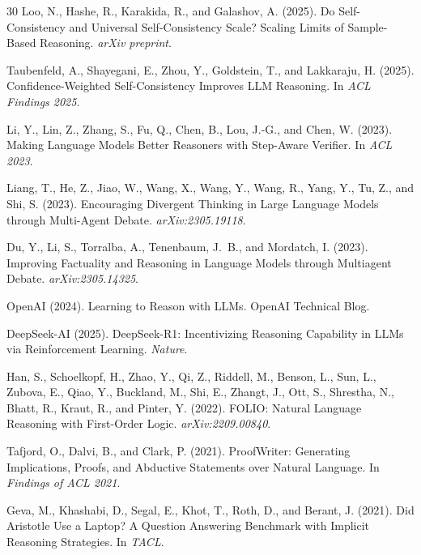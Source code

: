 \documentclass[11pt,a4paper]{article}
\begin{document}
\begin{thebibliography}{30}
Loo, N., Hashe, R., Karakida, R., and Galashov, A. (2025).
\newblock Do Self-Consistency and Universal Self-Consistency Scale? Scaling Limits of Sample-Based Reasoning.
\newblock \emph{arXiv preprint}.

Taubenfeld, A., Shayegani, E., Zhou, Y., Goldstein, T., and Lakkaraju, H. (2025).
\newblock Confidence-Weighted Self-Consistency Improves LLM Reasoning.
\newblock In \emph{ACL Findings 2025}.

Li, Y., Lin, Z., Zhang, S., Fu, Q., Chen, B., Lou, J.-G., and Chen, W. (2023).
\newblock Making Language Models Better Reasoners with Step-Aware Verifier.
\newblock In \emph{ACL 2023}.

Liang, T., He, Z., Jiao, W., Wang, X., Wang, Y., Wang, R., Yang, Y., Tu, Z., and Shi, S. (2023).
\newblock Encouraging Divergent Thinking in Large Language Models through Multi-Agent Debate.
\newblock \emph{arXiv:2305.19118}.

Du, Y., Li, S., Torralba, A., Tenenbaum, J.~B., and Mordatch, I. (2023).
\newblock Improving Factuality and Reasoning in Language Models through Multiagent Debate.
\newblock \emph{arXiv:2305.14325}.

OpenAI (2024).
\newblock Learning to Reason with LLMs.
\newblock OpenAI Technical Blog.

DeepSeek-AI (2025).
\newblock DeepSeek-R1: Incentivizing Reasoning Capability in LLMs via Reinforcement Learning.
\newblock \emph{Nature}.

Han, S., Schoelkopf, H., Zhao, Y., Qi, Z., Riddell, M., Benson, L., Sun, L., Zubova, E., Qiao, Y., Buckland, M., Shi, E., Zhangt, J., Ott, S., Shrestha, N., Bhatt, R., Kraut, R., and Pinter, Y. (2022).
\newblock FOLIO: Natural Language Reasoning with First-Order Logic.
\newblock \emph{arXiv:2209.00840}.

Tafjord, O., Dalvi, B., and Clark, P. (2021).
\newblock ProofWriter: Generating Implications, Proofs, and Abductive Statements over Natural Language.
\newblock In \emph{Findings of ACL 2021}.

Geva, M., Khashabi, D., Segal, E., Khot, T., Roth, D., and Berant, J. (2021).
\newblock Did Aristotle Use a Laptop? A Question Answering Benchmark with Implicit Reasoning Strategies.
\newblock In \emph{TACL}.


\end{thebibliography}
\end{document}
